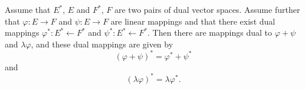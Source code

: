 Assume that $E^*$, $E$ and $F^*$, $F$ are two pairs of dual vector spaces. Assume further that $\varphi: E \rightarrow F$ and $\psi: E \rightarrow F$ are linear mappings and that there exist dual mappings $\varphi^*: E^* \leftarrow F^*$ and $\psi^*: E^* \leftarrow F^*$. Then there are mappings dual to $\varphi + \psi$ and $\lambda \varphi$, and these dual mappings are given by
$$(\varphi + \psi)^* = \varphi^* + \psi^*$$
and
$$(\lambda \varphi)^* = \lambda \varphi^*.$$
